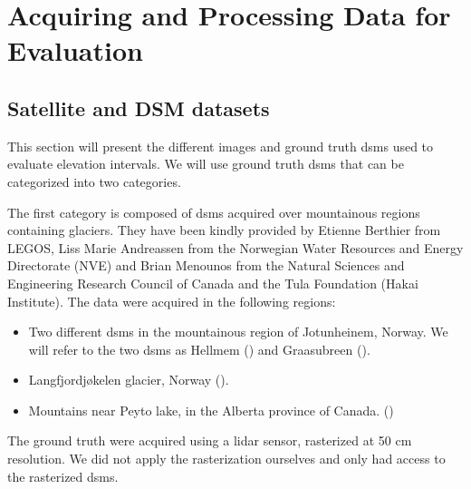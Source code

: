 \section{Acquiring and Processing Data for Evaluation}
\subsection{Satellite and DSM datasets}
This section will present the different images and ground truth \acrshort{dsm}s used to evaluate elevation intervals. We will use ground truth \acrshort{dsm}s that can be categorized into two categories.

The first category is composed of \acrshort{dsm}s acquired over mountainous regions containing glaciers. They have been kindly provided by Etienne Berthier from LEGOS, Liss Marie Andreassen from the Norwegian Water Resources and Energy Directorate (NVE) and Brian Menounos from the Natural Sciences and Engineering Research Council of Canada and the Tula Foundation (Hakai Institute). The data were acquired in the following regions:
\begin{itemize}
    \item Two different \acrshort{dsm}s in the mountainous region of Jotunheinem, Norway. We will refer to the two \acrshort{dsm}s as Hellmem () and Graasubreen ().
    \item Langfjordjøkelen glacier, Norway ().
    \item Mountains near Peyto lake, in the Alberta province of Canada. ()
\end{itemize}
The ground truth were acquired using a \acrshort{lidar} sensor, rasterized at 50 cm resolution. We did not apply the rasterization ourselves and only had access to the rasterized \acrshort{dsm}s.

